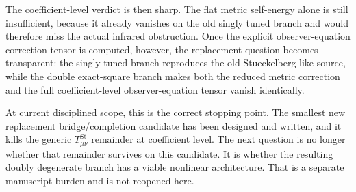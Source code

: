 \documentclass[11pt]{article}
\begin{document}
The coefficient-level verdict is then sharp. The flat metric self-energy alone is still insufficient, because it already vanishes on the old singly tuned branch and would therefore miss the actual infrared obstruction. Once the explicit observer-equation correction tensor is computed, however, the replacement question becomes transparent: the singly tuned branch reproduces the old Stueckelberg-like source, while the double exact-square branch makes both the reduced metric correction and the full coefficient-level observer-equation tensor vanish identically.

At current disciplined scope, this is the correct stopping point. The smallest new replacement bridge/completion candidate has been designed and written, and it kills the generic \(T_{\mu\nu}^{\mathrm{St}}\) remainder at coefficient level. The next question is no longer whether that remainder survives on this candidate. It is whether the resulting doubly degenerate branch has a viable nonlinear architecture. That is a separate manuscript burden and is not reopened here.
\end{document}
